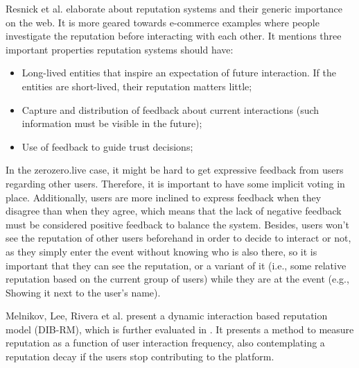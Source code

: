 Resnick et al. \cite{Resnick2000} elaborate about reputation systems and their generic importance on the web. It is more geared towards e-commerce examples where people investigate the reputation before interacting with each other. It mentions three important properties reputation systems should have:
\begin{itemize}
    \item Long-lived entities that inspire an expectation of future interaction. If the entities are short-lived, their reputation matters little;
    \item Capture and distribution of feedback about current interactions (such information must be visible in the future);
    \item Use of feedback to guide trust decisions;
\end{itemize}
In the zerozero.live case, it might be hard to get expressive feedback from users regarding other users. Therefore, it is important to have some implicit voting in place. Additionally, users are more inclined to express feedback when they disagree than when they agree, which means that the lack of negative feedback must be considered positive feedback to balance the system. Besides, users won't see the reputation of other users beforehand in order to decide to interact or not, as they simply enter the event without knowing who is also there, so it is important that they can see the reputation, or a variant of it (i.e., some relative reputation based on the current group of users) while they are at the event (e.g., Showing it next to the user's name).

Melnikov, Lee, Rivera et al. \cite{Melnikov2018} present a dynamic interaction based reputation model (DIB-RM), which is further evaluated in \cite{Yashkina2020}. It presents a method to measure reputation as a function of user interaction frequency, also contemplating a reputation decay if the users stop contributing to the platform. 

